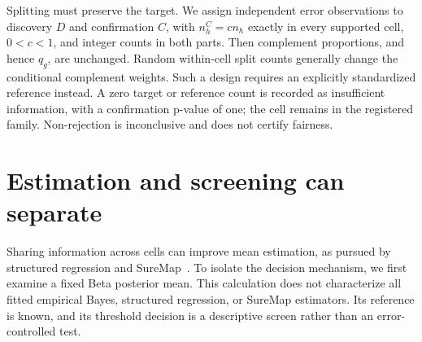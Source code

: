 Splitting must preserve the target. We assign independent error
observations to discovery $D$ and confirmation $C$, with
$n_h^C=c n_h$ exactly in every supported cell, $0<c<1$, and integer counts in both
parts. Then complement proportions, and hence $q_g$, are unchanged.
Random within-cell split counts generally change the conditional
complement weights. Such a design requires an explicitly standardized
reference instead. A zero target or reference count is recorded as
insufficient information, with a confirmation p-value of one; the cell remains
in the registered family. Non-rejection is inconclusive and does not
certify fairness.

\section{Estimation and screening can separate}\label{sec:separation}

Sharing information across cells can improve mean estimation, as pursued
by structured regression and SureMap~\citep{herlihy2024structured,khodak2024suremap}. To isolate the decision
mechanism, we first examine a fixed Beta posterior mean. This calculation
does not characterize all fitted empirical Bayes, structured regression,
or SureMap estimators. Its reference is known, and its threshold decision
is a descriptive screen rather than an error-controlled test.

